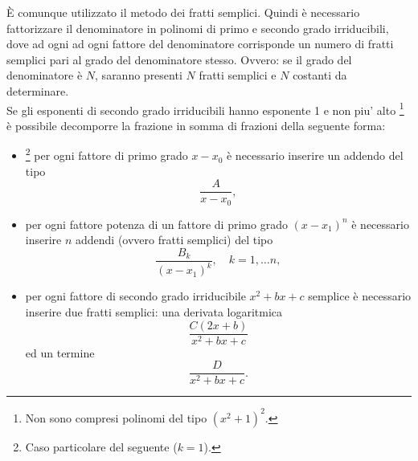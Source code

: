 È comunque utilizzato il metodo dei fratti semplici. Quindi è necessario fattorizzare il denominatore in polinomi di primo e secondo grado irriducibili, dove ad ogni ad ogni fattore del denominatore corrisponde un numero di fratti semplici pari al grado del denominatore stesso. Ovvero: se il grado del denominatore è $N$, saranno presenti $N$ fratti semplici e $N$ costanti da determinare.\\
Se gli esponenti di secondo grado irriducibili hanno esponente 1 e non piu' alto \footnote{Non sono compresi polinomi del tipo $(x^2+1)^2$.} è possibile decomporre la frazione in somma di frazioni della seguente forma:
\begin{itemize}
    \item\footnote{Caso particolare del seguente ($k=1$).} per ogni fattore di primo grado $x-x_0$ è necessario inserire un addendo del tipo
    \begin{equation*}
        \frac{A}{x-x_0},
    \end{equation*}
    \item per ogni fattore potenza di un fattore di primo grado $(x-x_1)^n$ è necessario inserire $n$ addendi (ovvero fratti semplici) del tipo
    \begin{equation*}
        \frac{B_k}{(x-x_1)^k},\quad k=1,\hdots n,
    \end{equation*}
    \item per ogni fattore di secondo grado irriducibile $x^2+bx+c$ semplice è necessario inserire due fratti semplici: una derivata logaritmica
    \begin{equation*}
        \frac{C(2x+b)}{x^2+bx+c}
    \end{equation*}
    ed un termine
    \begin{equation*}
        \frac{D}{x^2+bx+c}.
    \end{equation*}
\end{itemize}
